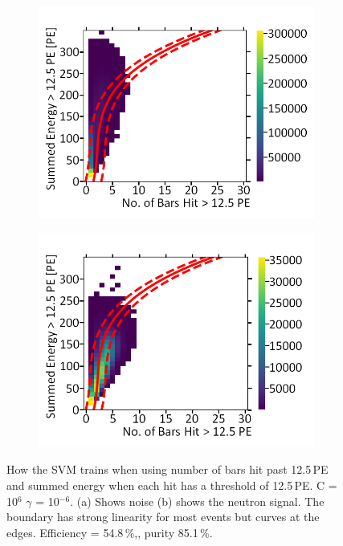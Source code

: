 \begin{figure}[!h]
\centering
\begin{subfigure}{.5\textwidth}
  \centering
  \includegraphics[width=\linewidth]{Appendix1/Figs/Bars2Sum2Noise.png}
  \captionsetup{width=.9\linewidth}
  \caption{}
  \label{subFig:Bars2Sum2N}
\end{subfigure}%
\begin{subfigure}{.5\textwidth}
  \centering
\includegraphics[width=\linewidth]{Appendix1/Figs/Bars2Sum2Signal.png}
  \captionsetup{width=.9\linewidth}
  \caption{}
  \label{subFig:Bars2Sum2S}
\end{subfigure}
\caption[LIBLINEAR SVM Nyström approximated RBF kernel for number of bars hit > 12.5\,PE vs summed energy > 12.5\,PE.]{How the SVM trains when using number of bars hit past 12.5\,PE and summed energy when each hit has a threshold of 12.5\,PE. C = 10$^6$ $\gamma$ = 10$^{-6}$. (a) Shows noise (b) shows the neutron signal. The boundary has strong linearity for most events but curves at the edges. Efficiency = 54.8\,\%,, purity 85.1\,\%.}
\label{fig:Bars2Sum2SN}
\end{figure}

